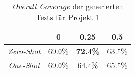 \bgroup
\def\arraystretch{2}
\begin{table}[H]
	\vspace{.5cm}
	\centering		
	\begin{center}
		\begin{tabular}{|c||c|c|c|}
			\hline 
			& 0 & 0.25 & 0.5 \\
			\hline 
			\hline
			\textit{Zero-Shot} & 69.0\% & \textbf{72.4\%} & 63.5\% \\
			\hline
			\textit{One-Shot} & 69.0\% & 64.4\% & 65.5\% \\
			\hline
		\end{tabular} 
	\end{center}
	\caption{\textit{Overall Coverage} der generierten Tests für Projekt 1}
	\label{fig:o-1}
	\vspace{-.8cm}
\end{table}
\egroup